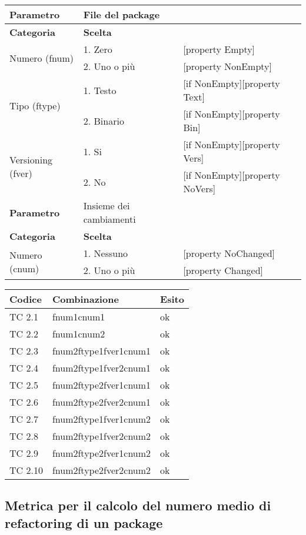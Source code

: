 \begin{tabular}{|p{4cm}|p{4cm}p{5cm}|}
	\hline
	\cellcolor{Gray} 	\textbf{Parametro}		& File del package				&							\tabularnewline
	\hline
	\rowcolor{Gray}		\textbf{Categoria} 				& \textbf{Scelta}		&							\tabularnewline
	\hline
	\multirow{2}{*}{Numero (fnum)} 			& 1. Zero 			& [property Empty] 					\tabularnewline
	\cline{2-3}
							& 2. Uno o più			& [property NonEmpty]					\tabularnewline
	\hline
	\multirow{2}{*}{Tipo (ftype)} 			& 1. Testo			& [if NonEmpty][property Text] 				\tabularnewline
	\cline{2-3}
							& 2. Binario			& [if NonEmpty][property Bin]				\tabularnewline
	\hline
	\multirow{2}{*}{Versioning (fver)}		& 1. Si				& [if NonEmpty][property Vers]				\tabularnewline
	\cline{2-3}
							& 2. No				& [if NonEmpty][property NoVers]			\tabularnewline
	\hline
	\cellcolor{Gray} \textbf{Parametro}		& Insieme dei cambiamenti	&							\tabularnewline
	\hline
	\rowcolor{Gray}
	\textbf{Categoria} 				& \textbf{Scelta}		&							\tabularnewline
	\hline
	\multirow{2}{*}{Numero (cnum)} 			& 1. Nessuno 			& [property NoChanged]					\tabularnewline
	\cline{2-3}
							& 2. Uno o più			& [property Changed]					\tabularnewline
	\hline
\end{tabular}

\vspace{1cm}

\begin{tabular}{|p{3cm}|p{7cm}|p{3cm}|}
	  \hline
	  \rowcolor{Gray}
	  \textbf{Codice} & \textbf{Combinazione} & \textbf{Esito}\tabularnewline
	  \hline
	  TC 2.1			& fnum1cnum1 			& ok \tabularnewline
	  \hline
	  TC 2.2 			& fnum1cnum2 			& ok \tabularnewline
	  \hline
	  TC 2.3 			& fnum2ftype1fver1cnum1 	& ok \tabularnewline
	  \hline
	  TC 2.4 			& fnum2ftype1fver2cnum1 	& ok \tabularnewline
	  \hline
	  TC 2.5 			& fnum2ftype2fver1cnum1 	& ok \tabularnewline
	  \hline
	  TC 2.6 			& fnum2ftype2fver2cnum1		& ok \tabularnewline
	  \hline
	  TC 2.7 			& fnum2ftype1fver1cnum2 	& ok \tabularnewline
	  \hline
	  TC 2.8			& fnum2ftype1fver2cnum2 	& ok \tabularnewline
	  \hline
	  TC 2.9			& fnum2ftype2fver1cnum2 	& ok \tabularnewline
	  \hline
	  TC 2.10 			& fnum2ftype2fver2cnum2 	& ok \tabularnewline
	  \hline
\end{tabular}
\clearpage




\subsection{Metrica per il calcolo del numero medio di refactoring di un package}

